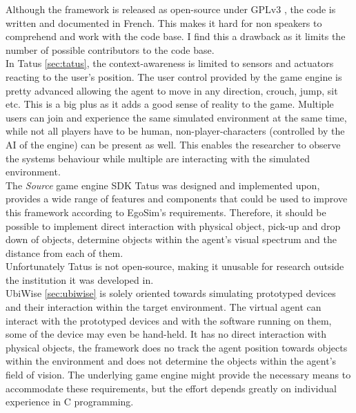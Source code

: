 Although the framework is released as open-source \cite{bouchard:simact:Online} under GPLv3 \cite{gpl:v3}, the code is written and documented in French. This makes it hard for non speakers to comprehend and work with the code base. I find this a drawback as it limits the number of possible contributors to the code base.\\

In Tatus \ref{sec:tatus}, the context-awareness is limited to sensors and actuators reacting to the user's position. The user control provided by the game engine is pretty advanced allowing the agent to move in any direction, crouch, jump, sit etc. This is a big plus as it adds a good sense of reality to the game. Multiple users can join and experience the same simulated environment at the same time, while not all players have to be human, non-player-characters (controlled by the AI of the engine) can be present as well. This enables the researcher to observe the systems behaviour while multiple are interacting with the simulated environment.\\

The \emph{Source} game engine SDK \cite{valvesrc:online} Tatus was designed and implemented upon, provides a wide range of features and components that could be used to improve this framework according to EgoSim's requirements. Therefore, it should be possible to implement direct interaction with physical object, pick-up and drop down of objects, determine objects within the agent's visual spectrum and the distance from each of them.\\


Unfortunately Tatus is not open-source, making it unusable for research outside the institution it was developed in.\\

UbiWise \ref{sec:ubiwise} is solely oriented towards simulating prototyped devices and their interaction within the target environment. The virtual agent can interact with the prototyped devices and with the software running on them, some of the device may even be hand-held. It has no direct interaction with physical objects, the framework does no track the agent position towards objects within the environment and does not determine the objects within the agent's field of vision. The underlying game engine might provide the necessary means to accommodate these requirements, but the effort depends greatly on individual experience in C programming.\\

